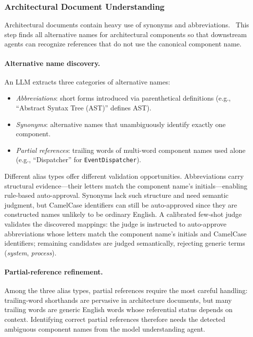 \subsubsection{Architectural Document Understanding}\label{sec:doc-understanding}

Architectural documents contain heavy use of synonyms and
abbreviations.~
This step finds all alternative names for architectural components
so that downstream agents can recognize references that do not use the
canonical component name.

\paragraph{Alternative name discovery.}
An LLM extracts three categories of alternative names:
\begin{itemize}
    \item \emph{Abbreviations}: short forms introduced via parenthetical
      definitions (e.g., ``Abstract Syntax Tree (AST)'' defines AST).
    \item \emph{Synonyms}: alternative names that unambiguously identify
      exactly one component.
    \item \emph{Partial references}: trailing words of multi-word
      component names used alone (e.g., ``Dispatcher'' for
      \texttt{EventDispatcher}).
\end{itemize}

Different alias types offer different validation opportunities.
Abbreviations carry structural evidence---their letters match the
component name's initials---enabling rule-based auto-approval.
Synonyms lack such structure and need semantic judgment, but
CamelCase identifiers can still be auto-approved since they are
constructed names unlikely to be ordinary English.
A calibrated few-shot judge validates the discovered mappings:
the judge is instructed to auto-approve abbreviations whose letters
match the component name's initials and CamelCase identifiers;
remaining candidates are judged semantically, rejecting generic
terms (\emph{system}, \emph{process}).

\paragraph{Partial-reference refinement.}
Among the three alias types, partial references require the most
careful handling: trailing-word shorthands are pervasive in
architecture documents, but many trailing words are generic English
words whose referential status depends on context.
Identifying correct partial references therefore needs the detected
ambiguous component names from the model understanding agent.


